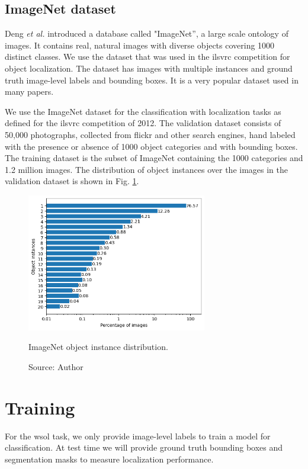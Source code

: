\subsection{ImageNet dataset}
Deng \textit{et al.} \cite{deng2009imagenet} introduced a database called "ImageNet”, a large scale ontology of images. It contains real, natural images with diverse objects covering 1000 distinct classes. We use the dataset that was used in the \acrfull{ilsvrc} competition for object localization. The dataset has images with multiple instances and ground truth image-level labels and bounding boxes. It is a very popular dataset used in many papers.

We use the ImageNet dataset for the classification with localization tasks as defined for the \acrfull{ilsvrc} competition of 2012. The validation dataset consists of 50,000 photographs, collected from flickr and other search engines, hand labeled with the presence or absence of 1000 object categories and with bounding boxes. The training dataset is the subset of ImageNet containing the 1000 categories and 1.2 million images. The distribution of object instances over the images in the validation dataset is shown in Fig. \ref{fig:imagenet_instance_distribution}.
\begin{figure}[ht]
    \begin{center}       
    \includegraphics[width=0.7\textwidth]{fig_imagenet_distrib.png}
    \caption[ImageNet object instance distribution]{ImageNet object instance distribution.}
    \caption*{Source: Author}
    \label{fig:imagenet_instance_distribution}
    \end{center}
\end{figure}

\section{Training}
For the \acrlong{wsol} task, we only provide image-level labels to train a model for classification. At test time we will provide ground truth bounding boxes and segmentation masks  to measure localization performance.

